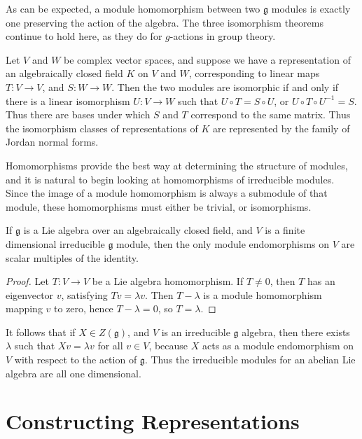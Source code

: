 As can be expected, a module homomorphism between two $\mathfrak{g}$ modules is exactly one preserving the action of the algebra. The three isomorphism theorems continue to hold here, as they do for $g$-actions in group theory.

\begin{example}
    Let $V$ and $W$ be complex vector spaces, and suppose we have a representation of an algebraically closed field $K$ on $V$ and $W$, corresponding to linear maps $T: V \to V$, and $S: W \to W$. Then the two modules are isomorphic if and only if there is a linear isomorphism $U: V \to W$ such that $U \circ T = S \circ U$, or $U \circ T \circ U^{-1} = S$. Thus there are bases under which $S$ and $T$ correspond to the same matrix. Thus the isomorphism classes of representations of $K$ are represented by the family of Jordan normal forms.
\end{example}

Homomorphisms provide the best way at determining the structure of modules, and it is natural to begin looking at homomorphisms of irreducible modules. Since the image of a module homomorphism is always a submodule of that module, these homomorphisms must either be trivial, or isomorphisms.

\begin{lemma}[Schur]
    If $\mathfrak{g}$ is a Lie algebra over an algebraically closed field, and $V$ is a finite dimensional irreducible $\mathfrak{g}$ module, then the only module endomorphisms on $V$ are scalar multiples of the identity.
\end{lemma}
\begin{proof}
    Let $T: V \to V$ be a Lie algebra homomorphism. If $T \neq 0$, then $T$ has an eigenvector $v$, satisfying $Tv = \lambda v$. Then $T - \lambda$ is a module homomorphism mapping $v$ to zero, hence $T - \lambda = 0$, so $T = \lambda$.
\end{proof}

It follows that if $X \in Z(\mathfrak{g})$, and $V$ is an irreducible $\mathfrak{g}$ algebra, then there exists $\lambda$ such that $Xv = \lambda v$ for all $v \in V$, because $X$ acts as a module endomorphism on $V$ with respect to the action of $\mathfrak{g}$. Thus the irreducible modules for an abelian Lie algebra are all one dimensional.

\section{Constructing Representations}

